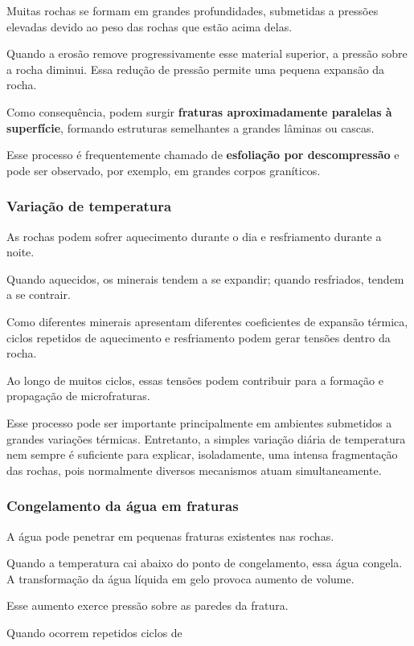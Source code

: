 Muitas rochas se formam em grandes profundidades, submetidas a pressões elevadas devido ao peso das rochas que estão acima delas.

Quando a erosão remove progressivamente esse material superior, a pressão sobre a rocha diminui. Essa redução de pressão permite uma pequena expansão da rocha.

Como consequência, podem surgir \textbf{fraturas aproximadamente paralelas à superfície}, formando estruturas semelhantes a grandes lâminas ou cascas.

Esse processo é frequentemente chamado de \textbf{esfoliação por descompressão} e pode ser observado, por exemplo, em grandes corpos graníticos.

\subsubsection{Variação de temperatura}

As rochas podem sofrer aquecimento durante o dia e resfriamento durante a noite.

Quando aquecidos, os minerais tendem a se expandir; quando resfriados, tendem a se contrair.

Como diferentes minerais apresentam diferentes coeficientes de expansão térmica, ciclos repetidos de aquecimento e resfriamento podem gerar tensões dentro da rocha.

Ao longo de muitos ciclos, essas tensões podem contribuir para a formação e propagação de microfraturas.

Esse processo pode ser importante principalmente em ambientes submetidos a grandes variações térmicas. Entretanto, a simples variação diária de temperatura nem sempre é suficiente para explicar, isoladamente, uma intensa fragmentação das rochas, pois normalmente diversos mecanismos atuam simultaneamente.

\subsubsection{Congelamento da água em fraturas}

A água pode penetrar em pequenas fraturas existentes nas rochas.

Quando a temperatura cai abaixo do ponto de congelamento, essa água congela. A transformação da água líquida em gelo provoca aumento de volume.

Esse aumento exerce pressão sobre as paredes da fratura.

Quando ocorrem repetidos ciclos de

